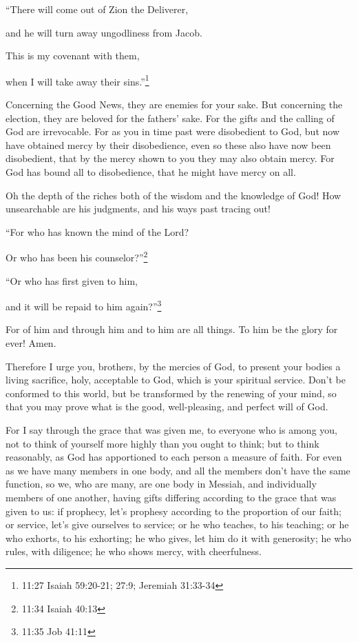 “There will come out of Zion the Deliverer,

and he will turn away ungodliness from Jacob.

\myverse{}This is my covenant with them,

when I will take away their sins.”\footnote{11:27 Isaiah 59:20-21; 27:9; Jeremiah 31:33-34}

\myverse{}Concerning the Good News, they are enemies for your sake. But
concerning the election, they are beloved for the fathers’ sake.
\myverse{}For the gifts and the calling of God are irrevocable.
\myverse{}For as you in time past were disobedient to God, but now have obtained mercy
by their disobedience,
\myverse{}even so these also have now been disobedient, that by the mercy shown to
you they may also obtain mercy.
\myverse{}For God has bound all to disobedience, that he might have mercy on all.

\myverse{}Oh the depth of the riches both of the wisdom and the knowledge
of God! How unsearchable are his judgments, and his ways past tracing out!

\myverse{}“For who has known the mind of the Lord?

Or who has been his counselor?”\footnote{11:34 Isaiah 40:13}

\myverse{}“Or who has first given to him,

and it will be repaid to him again?”\footnote{11:35 Job 41:11}

\myverse{}For of him and through him and to him are all things. To him
be the glory for ever! Amen.


\mychapter{} \myverse*{}Therefore I urge you, brothers, by the mercies of God, to present
your bodies a living sacrifice, holy, acceptable to God, which is your spiritual service.
\myverse{}Don’t be conformed to this world, but be transformed by the renewing of your
mind, so that you may prove what is the good, well-pleasing, and perfect will of God.

\myverse{}For I say through the grace that was given me, to everyone who
is among you, not to think of yourself more highly than you ought to think; but to think reasonably, as
God has apportioned to each person a measure of faith.
\myverse{}For even as we have many members in one body, and all the members don’t have
the same function,
\myverse{}so we, who are many, are one body in Messiah, and individually members of one
another,
\myverse{}having gifts differing according to the grace that was given to us: if prophecy,
let’s prophesy according to the proportion of our faith;
\myverse{}or service, let’s give ourselves to service; or he who teaches, to his teaching;
\myverse{}or he who exhorts, to his exhorting; he who gives, let him do it with generosity;
he who rules, with diligence; he who shows mercy, with cheerfulness.

